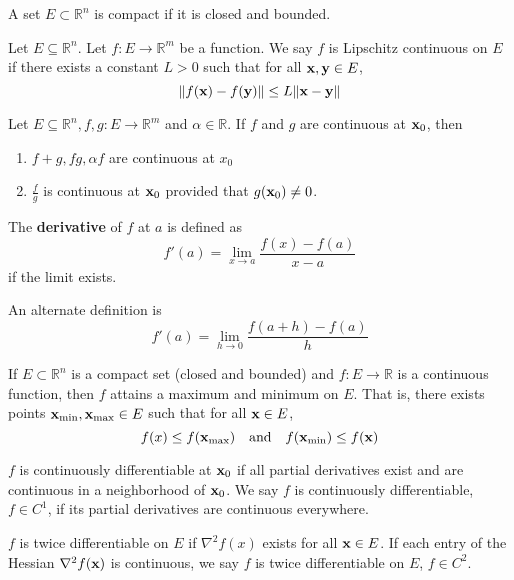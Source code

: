 \begin{definition}[Compact]
  A set $E \subset \mathbb R^n$ is compact if it is closed and bounded.
\end{definition}
\begin{definition}
  Let $E \subseteq \mathbb R^n$. Let $f: E \to \mathbb R^m$ be a function. We say $f$ is Lipschitz continuous on $E$ if there exists a constant $L > 0$ such that for all $\textbf{x}, \textbf{y} \in E$,
  $$\| f(\textbf{x}) - f(\textbf{y}) \| \leq L \| \textbf{x} - \textbf{y} \|$$
\end{definition}
\begin{theorem}
  Let $E \subseteq \mathbb R^n, f,g: E \to \mathbb R^m$ and $\alpha \in \mathbb R$. If $f$ and $g$ are continuous at $\textbf{x}_0$, then
  \begin{enumerate}
    \item $f + g, fg, \alpha f$ are continuous at $x_0$
    \item $\frac{f}{g}$ is continuous at $\textbf{x}_0$ provided that $g(\textbf{x}_0) \neq 0$.
  \end{enumerate}
\end{theorem}
\begin{definition}
  The \textbf{derivative} of $f$ at $a$ is defined as $$f'(a) = \lim_{x \rightarrow a} \frac{f(x) - f(a)}{x-a}$$ if the limit exists.

  An alternate definition is
  $$f'(a) = \lim_{h \rightarrow 0} \frac{f(a+h) - f(a)}{h}$$
\end{definition}
\begin{theorem}
  If $E \subset \mathbb R^n$ is a compact set (closed and bounded) and $f: E \to \mathbb R$ is a continuous function, then $f$ attains a maximum and minimum on $E$. That is, there exists points $\textbf{x}_{\text{min}}, \textbf{x}_{\text{max}} \in E$ such that for all $\textbf{x} \in E$,
  $$f(x) \leq f(\textbf{x}_{\text{max}}) \quad \text{and} \quad f(\textbf{x}_{\text{min}}) \leq f(\textbf{x})$$
\end{theorem}
\begin{theorem}
  $f$ is continuously differentiable at $\textbf{x}_0$ if all partial derivatives exist and are continuous in a neighborhood of $\textbf{x}_0$. We say $f$ is continuously differentiable, $f \in C^1$, if its partial derivatives are continuous everywhere.

  \bigskip
  $f$ is twice differentiable on $E$ if $\nabla^2 f(x)$ exists for all $\textbf{x} \in E$. If each entry of the Hessian $\nabla^2 f(\textbf{x})$ is continuous, we say $f$ is twice differentiable on $E$, $f \in C^2$.
\end{theorem}

